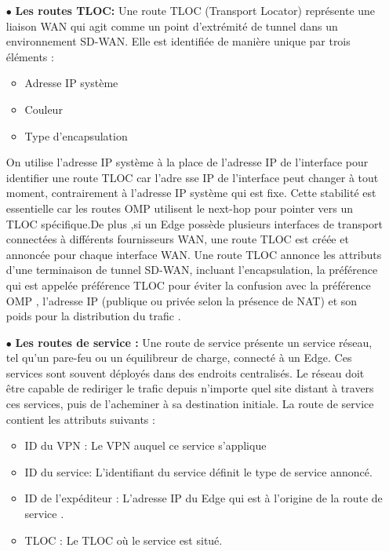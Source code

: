 \begin{itemize}
	\item[$\bullet$]\textbf{ Les routes TLOC: } 
Une route TLOC (Transport Locator) représente une liaison WAN qui agit comme un point d'extrémité de tunnel dans un environnement SD-WAN. Elle est identifiée de manière unique par trois éléments :
\begin{itemize}
	\item{ 	Adresse IP système} 
\end{itemize}
\begin{itemize}
	\item{ Couleur} 
\end{itemize}
\begin{itemize}
	\item{Type d'encapsulation} 
\end{itemize}

On utilise l'adresse IP système à la place de l'adresse IP de l'interface pour identifier une route TLOC car l'adre sse IP de l'interface peut changer à tout moment, contrairement à l'adresse IP système qui est fixe. Cette stabilité est essentielle car les routes OMP utilisent le next-hop pour pointer vers un TLOC spécifique.De plus ,si un Edge possède plusieurs interfaces de transport connectées à différents fournisseurs WAN, une route TLOC est créée et annoncée pour chaque interface WAN.
Une route TLOC annonce les attributs d'une terminaison de tunnel SD-WAN, incluant l'encapsulation, la préférence qui est appelée préférence TLOC pour éviter la confusion avec la préférence OMP , l'adresse IP (publique ou privée selon la présence de NAT) et son poids pour la distribution du trafic .

\end{itemize}

\begin{itemize}
	\item[$\bullet$]\textbf{ Les routes de service : } 
	Une route de service présente un service réseau, tel qu'un pare-feu ou un équilibreur de charge, connecté à un Edge. Ces services sont souvent déployés dans des endroits centralisés. Le réseau doit être capable de rediriger le trafic depuis n'importe quel site distant à travers ces services, puis de l’acheminer à sa destination initiale.
	La route de service contient les attributs suivants :
	\begin{itemize}
		\item{ ID du VPN  : Le VPN auquel ce service s'applique} 
	\end{itemize}
	\begin{itemize}
		\item{  ID du service: L'identifiant du service définit le type de service annoncé.} 
	\end{itemize}
	\begin{itemize}
		\item{	ID de l'expéditeur : L'adresse IP du Edge qui est à l'origine de la route de service .} 
	\end{itemize}
	\begin{itemize}
		\item{		TLOC : Le TLOC où le service est situé. } 
	\end{itemize}
	
	
\end{itemize}
